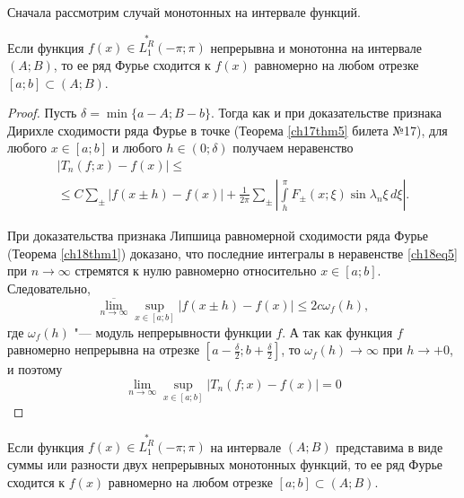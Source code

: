 Сначала рассмотрим случай монотонных на интервале функций.

\begin{thm} \label{ch18thm3}
Если функция $f(x) \in \overset{*}{L^{R}_1}(-\pi;\pi)$ непрерывна и монотонна на интервале $(A;B)$, то ее ряд Фурье сходится к $f(x)$ равномерно на любом отрезке $[a;b] \subset (A;B)$.
\end{thm}
\begin{proof}
Пусть $\delta = \min \{a - A; B - b\}$. Тогда как и при доказательстве признака Дирихле сходимости ряда Фурье в точке (Теорема \ref{ch17thm5} билета №17), для любого $x \in [a;b]$ и любого $h \in (0;\delta)$ получаем неравенство
\begin{multline} \label{ch18eq5}
|T_n(f; x) - f(x)| \le\\
\le C\sum_{\pm}|f(x \pm h) - f(x)| + \frac{1}{2\pi} \sum_{\pm} \left|\int\limits_{h}^{\pi} F_{\pm}(x; \xi) \sin{\lambda_n \xi} \,d\xi \right|.
\end{multline}

При доказательства признака Липшица равномерной сходимости ряда Фурье (Теорема \ref{ch18thm1}) доказано, что последние интегралы в неравенстве \eqref{ch18eq5} при $n \to \infty$ стремятся к нулю равномерно относительно $x \in [a;b]$. Следовательно,
$$
\overline{\lim\limits_{n \to \infty}} \sup \limits_{x \in [a;b]} |f(x \pm h) - f(x)| \le 2c\omega_{f}(h),
$$
где $\omega_{f}(h)$ "--- модуль непрерывности функции $f$. А так как функция $f$ равномерно непрерывна на отрезке $\left[a - \frac{\delta}{2}; b + \frac{\delta}{2}\right]$, то $\omega_{f}(h) \to \infty$ при $h \to +0$, и поэтому
$$
\lim\limits_{n \to \infty} \sup\limits_{x \in [a;b]} |T_n(f; x) - f(x)| = 0
$$
\end{proof}
\begin{cons}
Если функция $f(x) \in \overset{*}{L^{R}_1}(-\pi;\pi)$ на интервале $(A;B)$ представима в виде суммы или разности двух непрерывных монотонных функций, то ее ряд Фурье сходится к $f(x)$ равномерно на любом отрезке $[a;b] \subset (A;B)$.
\end{cons}

